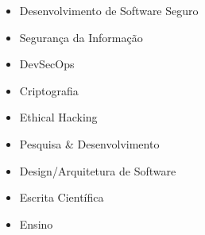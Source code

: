 


    \sidedivider


    \sidedivider



    \smallskip
    \smallskip
    \smallskip

\smallskip
{}

    \begin{itemize}
        \item Desenvolvimento de Software Seguro
        \item Segurança da Informação
        \item DevSecOps
        \item Criptografia
        \item Ethical Hacking
        \item Pesquisa \& Desenvolvimento
        \item Design/Arquitetura de Software
        \item Escrita Científica
        \item Ensino
    \end{itemize}


